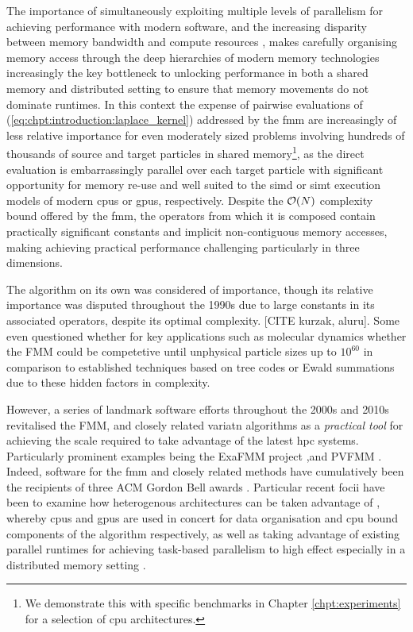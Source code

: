 The importance of simultaneously exploiting multiple levels of parallelism for achieving performance with modern software, and the increasing disparity between memory bandwidth and compute resources \cite{dongarra2017extreme}, makes carefully organising memory access through the deep hierarchies of modern memory technologies increasingly the key bottleneck to unlocking performance in both a shared memory and distributed setting to ensure that memory movements do not dominate runtimes. In this context the expense of pairwise evaluations of (\ref{eq:chpt:introduction:laplace_kernel}) addressed by the \acrshort{fmm} are increasingly of less relative importance for even moderately sized problems involving hundreds of thousands of source and target particles in shared memory\footnote{We demonstrate this with specific benchmarks in Chapter \ref{chpt:experiments} for a selection of \acrshort{cpu} architectures.}, as the direct evaluation is embarrassingly parallel over each target particle with significant opportunity for memory re-use and well suited to the \acrshort{simd} or \acrshort{simt} execution models of modern \glspl{cpu} or \glspl{gpu}, respectively. Despite the $\mathcal{O}(N)$ complexity bound offered by the \acrshort{fmm}, the operators from which it is composed contain practically significant constants and implicit non-contiguous memory accesses, making achieving practical performance challenging particularly in three dimensions.

The algorithm on its own was considered of importance, though its relative importance was disputed throughout the 1990s due to large constants in its associated operators, despite its optimal complexity. [CITE kurzak, aluru]. Some even questioned whether for key applications such as molecular dynamics whether the FMM could be competetive until unphysical particle sizes up to $10^60$ in comparison to established techniques based on tree codes or Ewald summations due to these hidden factors in complexity.

However, a series of landmark software efforts throughout the 2000s and 2010s revitalised the FMM, and closely related variatn algorithms as a \textit{practical tool} for achieving the scale required to take advantage of the latest \acrfull{hpc} systems. Particularly prominent examples being the ExaFMM project \cite{barba2011exafmm, wang2021exafmm},and PVFMM \cite{malhotra2015pvfmm}. Indeed, software for the \acrshort{fmm} and closely related methods have cumulatively been the recipients of three ACM Gordon Bell awards \cite{bell2017look}. Particular recent focii have been to examine how heterogenous architectures can be taken advantage of \cite{malhotra2015pvfmm}, whereby \glspl{cpu} and \glspl{gpu} are used in concert for data organisation and \acrshort{cpu} bound components of the algorithm respectively, as well as taking advantage of existing parallel runtimes for achieving task-based parallelism to high effect especially in a distributed memory setting \cite{bramas2020tbfmm, agullo2014task}.

